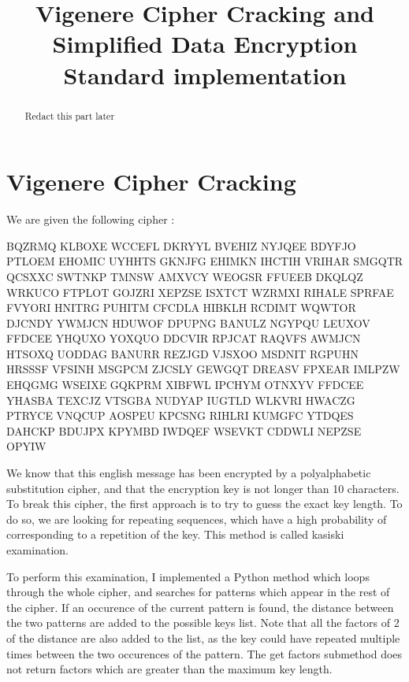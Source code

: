 \documentclass{article}
\title{\textbf{Vigenere Cipher Cracking and Simplified Data Encryption Standard implementation}}
\author{}
\date{}
\begin{document}
\maketitle \thispagestyle{fancy}

\begin{abstract}
    Redact this part later
    
\end{abstract}

\section{Vigenere Cipher Cracking}

    We are given the following cipher :

    \begin{python}
        BQZRMQ KLBOXE WCCEFL DKRYYL BVEHIZ NYJQEE BDYFJO PTLOEM EHOMIC
        UYHHTS GKNJFG EHIMKN IHCTIH VRIHAR SMGQTR QCSXXC SWTNKP TMNSW
        AMXVCY WEOGSR FFUEEB DKQLQZ WRKUCO FTPLOT GOJZRI XEPZSE ISXTCT
        WZRMXI RIHALE SPRFAE FVYORI HNITRG PUHITM CFCDLA HIBKLH RCDIMT
        WQWTOR DJCNDY YWMJCN HDUWOF DPUPNG BANULZ NGYPQU LEUXOV FFDCEE
        YHQUXO YOXQUO DDCVIR RPJCAT RAQVFS AWMJCN HTSOXQ UODDAG BANURR
        REZJGD VJSXOO MSDNIT RGPUHN HRSSSF VFSINH MSGPCM ZJCSLY GEWGQT
        DREASV FPXEAR IMLPZW EHQGMG WSEIXE GQKPRM XIBFWL IPCHYM OTNXYV
        FFDCEE YHASBA TEXCJZ VTSGBA NUDYAP IUGTLD WLKVRI HWACZG PTRYCE
        VNQCUP AOSPEU KPCSNG RIHLRI KUMGFC YTDQES DAHCKP BDUJPX KPYMBD
        IWDQEF WSEVKT CDDWLI NEPZSE OPYIW
    \end{python}

    
    We know that this english message has been encrypted by a polyalphabetic substitution cipher,
    and that the encryption key is not longer than 10 characters. \newline To break this cipher, 
    the first approach is to try to guess the exact key length. To do so, we are looking for
    repeating sequences, which have a high probability of corresponding to a repetition of the key. 
    This method is called kasiski examination.\cite{vigenere}

    To perform this examination, I implemented a Python method which loops through the whole cipher,
    and searches for patterns which appear in the rest of the cipher. If an occurence of the current 
    pattern is found, the distance between the two patterns are added to the possible keys list. Note 
    that all the factors of 2 of the distance are also added to the list, as the key could have repeated 
    multiple times between the two occurences of the pattern. The get factors submethod does not return factors
    which are greater than the maximum key length.
\end{document}
